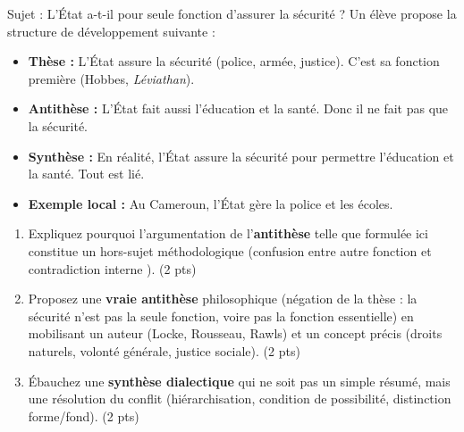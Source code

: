 \documentclass[11pt]{article}
\begin{document}
\begin{exercice}
Sujet : \og L'État a-t-il pour seule fonction d'assurer la sécurité ? \fg{}
Un élève propose la structure de développement suivante :
\begin{itemize}
    \item \textbf{Thèse :} L'État assure la sécurité (police, armée, justice). C'est sa fonction première (Hobbes, \textit{Léviathan}).
    \item \textbf{Antithèse :} L'État fait aussi l'éducation et la santé. Donc il ne fait pas que la sécurité.
    \item \textbf{Synthèse :} En réalité, l'État assure la sécurité pour permettre l'éducation et la santé. Tout est lié.
    \item \textbf{Exemple local :} Au Cameroun, l'État gère la police et les écoles.
\end{itemize}
\begin{enumerate}
    \item Expliquez pourquoi l'argumentation de l'\textbf{antithèse} telle que formulée ici constitue un \og hors-sujet \fg{} méthodologique (confusion entre \og autre fonction \fg{} et \og contradiction interne \fg{}). (2 pts)
    \item Proposez une \textbf{vraie antithèse} philosophique (négation de la thèse : la sécurité n'est pas la seule fonction, voire pas la fonction essentielle) en mobilisant un auteur (Locke, Rousseau, Rawls) et un concept précis (droits naturels, volonté générale, justice sociale). (2 pts)
    \item Ébauchez une \textbf{synthèse dialectique} qui ne soit pas un simple résumé, mais une résolution du conflit (hiérarchisation, condition de possibilité, distinction forme/fond). (2 pts)
\end{enumerate}
\end{exercice}
\end{document}
